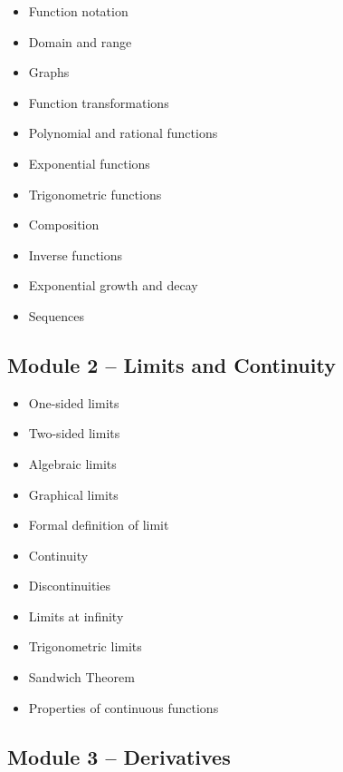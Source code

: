\documentclass[11pt]{article}
\begin{document}
\begin{itemize}[label=$\square$]
    \item Function notation
    \item Domain and range
    \item Graphs
    \item Function transformations
    \item Polynomial and rational functions
    \item Exponential functions
    \item Trigonometric functions
    \item Composition
    \item Inverse functions
    \item Exponential growth and decay
    \item Sequences
\end{itemize}

\subsection*{Module 2 -- Limits and Continuity}

\begin{itemize}[label=$\square$]
    \item One-sided limits
    \item Two-sided limits
    \item Algebraic limits
    \item Graphical limits
    \item Formal definition of limit
    \item Continuity
    \item Discontinuities
    \item Limits at infinity
    \item Trigonometric limits
    \item Sandwich Theorem
    \item Properties of continuous functions
\end{itemize}

\subsection*{Module 3 -- Derivatives}
\end{document}
